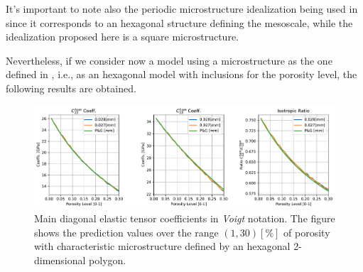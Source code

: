 \begin{rem}
It's important to note also the periodic microstructure idealization being used in \cite{Parnell2008} since it corresponds to an hexagonal structure defining the mesoscale, while the idealization proposed here is a square microstructure.
\end{rem}

Nevertheless, if we consider now a model using a microstructure as the one defined in \cite{Parnell2008}, i.e., as an hexagonal model with inclusions for the porosity level, the following results are obtained.

\begin{figure}[!h]
	\centering
	\includegraphics[scale=.5]{images/CellsProb/CellProb_MainHomCoeffsCircularHexa.pdf}
	\caption{Main diagonal elastic tensor coefficients in \textit{Voigt} notation. The figure shows the prediction values over the range $(1,30) [\%]$ of porosity with characteristic microstructure defined by an hexagonal 2-dimensional polygon.}
	\label{MainHomCoeffsHexagonal}
\end{figure}

